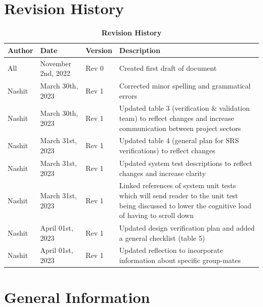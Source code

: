 \documentclass[12pt, titlepage]{article}
\begin{document}
\section{Revision History}
\begin{center}
\begin{table}[H]
\caption{\bf Revision History}
    \begin{tabular}{p{2cm}p{3cm}p{2cm}p{6cm}}
    \hline
    \bf Author & \bf Date & \bf Version & \bf Description\\
    \hline
    All & November 2nd, 2022 & Rev 0 & Created first draft of document\\
    \hline
    Nashit & March 30th, 2023 & Rev 1 & Corrected minor spelling and grammatical errors\\
    \hline
    Nashit & March 30th, 2023 & Rev 1 & Updated table 3 (verification \& validation team) to reflect changes and increase communication between project sectors\\
    \hline
    Nashit & March 31st, 2023 & Rev 1 & Updated table 4 (general plan for SRS verifications) to reflect changes\\
    \hline
    Nashit & March 31st, 2023 & Rev 1 & Updated system test descriptions to reflect changes and increase clarity \\
    \hline
    Nashit & March 31st, 2023 & Rev 1 & Linked references of system unit tests which will send reader to the unit test being discussed to lower the cognitive load of having to scroll down\\
    \hline
    Nashit & April 01st, 2023 & Rev 1 & Updated design verification plan and added a general checklist (table 5)\\
    \hline
    Nashit & April 01st, 2023 & Rev 1 & Updated reflection to incorporate information about specific group-mates\\
    \hline
    \end{tabular}
\end{table}
\end{center}



\section{General Information}
\end{document}
